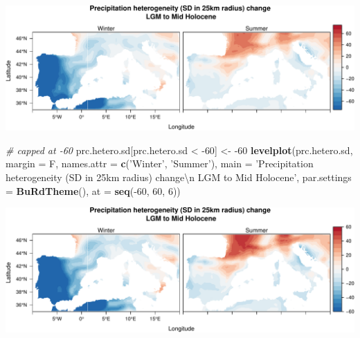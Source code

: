\documentclass[11pt,]{tufte-handout}
\newenvironment{Shaded}{}{}
\newcommand{\KeywordTok}[1]{\textcolor[rgb]{0.00,0.44,0.13}{\textbf{{#1}}}}
\newcommand{\DataTypeTok}[1]{\textcolor[rgb]{0.56,0.13,0.00}{{#1}}}
\newcommand{\DecValTok}[1]{\textcolor[rgb]{0.25,0.63,0.44}{{#1}}}
\newcommand{\CharTok}[1]{\textcolor[rgb]{0.25,0.44,0.63}{{#1}}}
\newcommand{\StringTok}[1]{\textcolor[rgb]{0.25,0.44,0.63}{{#1}}}
\newcommand{\CommentTok}[1]{\textcolor[rgb]{0.38,0.63,0.69}{\textit{{#1}}}}
\newcommand{\NormalTok}[1]{{#1}}
\begin{document}
\includegraphics{climate-analysis_files/figure-latex/unnamed-chunk-14-1}

\begin{Shaded}
\begin{Highlighting}[]
\CommentTok{# capped at -60}
\NormalTok{prc.hetero.sd[prc.hetero.sd <}\StringTok{ }\NormalTok{-}\DecValTok{60}\NormalTok{] <-}\StringTok{ }\NormalTok{-}\DecValTok{60}
\KeywordTok{levelplot}\NormalTok{(prc.hetero.sd, }\DataTypeTok{margin =} \NormalTok{F, }\DataTypeTok{names.attr =} \KeywordTok{c}\NormalTok{(}\StringTok{'Winter'}\NormalTok{, }\StringTok{'Summer'}\NormalTok{), }
          \DataTypeTok{main =} \StringTok{'Precipitation heterogeneity (SD in 25km radius) change}\CharTok{\textbackslash{}n}\StringTok{ LGM to Mid Holocene'}\NormalTok{,}
          \DataTypeTok{par.settings =} \KeywordTok{BuRdTheme}\NormalTok{(), }\DataTypeTok{at =} \KeywordTok{seq}\NormalTok{(-}\DecValTok{60}\NormalTok{, }\DecValTok{60}\NormalTok{, }\DecValTok{6}\NormalTok{))}
\end{Highlighting}
\end{Shaded}

\includegraphics{climate-analysis_files/figure-latex/unnamed-chunk-14-2}
\end{document}
